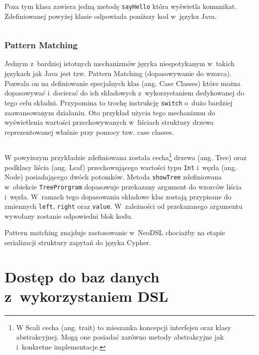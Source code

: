 \documentclass[brudnopis]{xmgr}
\begin{document}
\inputminted{scala}{listings/scala/simple-class-person.scala}

Poza tym klasa zawiera jedną metodę \texttt{sayHello} która wyświetla komunikat.
Zdefiniowanej powyżej klasie odpowiada poniższy kod w~języku Java.

\inputminted{scala}{listings/java/simple-class-person.java}

\subsection{Pattern Matching}

Jednym z~bardziej istotnych mechanizmów języka niespotykanym w~takich językach jak Java jest tzw. Pattern Matching (dopasowywanie do wzorca). Pozwala on na definiowanie specjalnych klas (ang. Case Classes) które można dopasowywać i~docierać do ich składowych z~wykorzystaniem dedykowanej do tego celu składni. Przypomina to trochę instrukcję \texttt{switch} o~dużo bardziej zaawansowanym działaniu. Oto przykład użycia tego mechanizmu do wyświetlenia wartości przechowywanych w~liściach struktury drzewa reprezentowanej właśnie przy pomocy tzw. case classes.

\inputminted{scala}{listings/scala/pattern-matching-trees.scala}

W powyższym przykładzie zdefiniowana została cecha\footnote{W Scali cecha (ang. trait) to mieszanka koncepcji interfejsu oraz klasy abstrakcyjnej. Mogą one posiadać zarówno metody abstrakcyjne jak i~konkretne implementacje.} drzewa (ang. Tree) oraz podklasy liścia (ang. Leaf) przechowującego wartości typu \texttt{Int} i~węzła (ang. Node) posiadającego dwóch potomków. Metoda \texttt{showTree} zdefiniowana w~obiekcie \texttt{TreeProrgram} dopasowuje przekazany argument do wzorców liścia i~węzła. W~ramach tego dopasowania składowe klas zostają przypisane do zmiennych \texttt{left}, \texttt{right} oraz \texttt{value}. W~zależności od przekazanego argumentu wywołany zostanie odpowiedni blok kodu.

Pattern matching znajduje zastosowanie w~NeoDSL chociażby na etapie serializacji struktury zapytań do języka Cypher.

\chapter{Dostęp do baz danych z~wykorzystaniem DSL}
\end{document}
